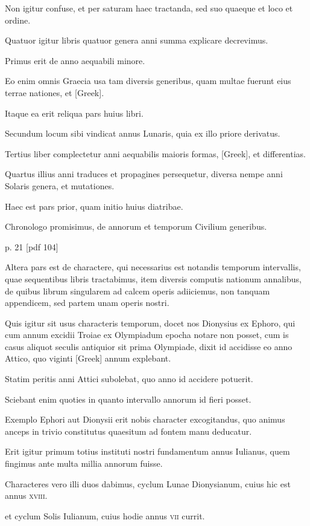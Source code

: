 Non igitur confuse, et per saturam haec
tractanda, sed suo quaeque et loco et ordine.

Quatuor igitur libris
quatuor genera anni summa explicare decrevimus.

Primus erit de
anno aequabili minore.

Eo enim omnis Graecia usa tam diversis generibus,
quam multae fuerunt eius terrae nationes, et \textgreek{[Greek]}.

Itaque
ea erit reliqua pars huius libri.

Secundum locum sibi vindicat annus
Lunaris, quia ex illo priore derivatus.

Tertius liber complectetur anni
aequabilis maioris formas, \textgreek{[Greek]}, et differentias.

Quartus illius anni
traduces et propagines persequetur, diversa nempe anni Solaris genera,
et mutationes.

Haec est pars prior, quam initio huius diatribae.

Chronologo promisimus, de annorum et temporum Civilium generibus.


p. 21 [pdf 104]

Altera pars est de charactere, qui necessarius est notandis temporum
intervallis, quae sequentibus libris tractabimus, item diversis
computis nationum annalibus, de quibus librum singularem ad calcem
operis adiiciemus, non tanquam appendicem, sed partem unam
operis nostri.

Quis igitur sit usus characteris temporum, docet nos
Dionysius ex Ephoro, qui cum annum excidii Troiae ex Olympiadum
epocha notare non posset, cum is casus aliquot seculis antiquior
sit prima Olympiade, dixit id accidisse eo anno Attico, quo viginti
\textgreek{[Greek]} annum explebant.

Statim peritis anni Attici subolebat,
quo anno id accidere potuerit.

Sciebant enim quoties in quanto
intervallo annorum id fieri posset.

Exemplo Ephori aut Dionysii
erit nobis character excogitandus, quo animus anceps in trivio constitutus
quaesitum ad fontem manu deducatur.

Erit igitur primum
totius instituti nostri fundamentum annus Iulianus, quem fingimus
ante multa millia annorum fuisse.

Characteres vero illi duos dabimus,
cyclum Lunae Dionysianum, cuius hic est annus \textsc{xviii}.

et cyclum
Solis Iulianum, cuius hodie annus \textsc{vii} currit.

